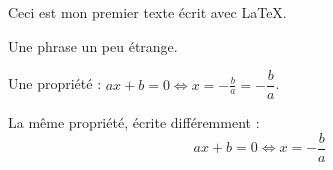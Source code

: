 \documentclass[12pt,frenchb]{book}
\begin{document}
Ceci est mon premier texte écrit avec \LaTeX.

Une
phrase
un
peu
étrange.









Une propriété :
$ax + b = 0 \Leftrightarrow x = - \frac b a = -  \dfrac b a$.

La même propriété, écrite différemment :
\[ax + b = 0 \Leftrightarrow x = - \frac b a\]
\end{document}
